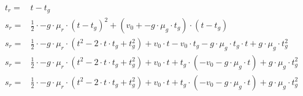\begin{equation}
\begin{aligned}
    t_r = & t - t_g\\
    s_r = & \frac{1}{2} \cdot -g \cdot \mu_r \cdot (t - t_g)^2 + (v_0 + -g \cdot \mu_g \cdot t_g) \cdot (t - t_g)\\
    s_r = & \frac{1}{2} \cdot -g \cdot \mu_r \cdot (t^2 - 2 \cdot t \cdot t_g + t_g^2) + v_0 \cdot t - v_0 \cdot t_g - g \cdot \mu_g \cdot t_g \cdot t + g \cdot \mu_g \cdot t_g^2\\
    s_r = & \frac{1}{2} \cdot -g \cdot \mu_r \cdot (t^2 - 2 \cdot t \cdot t_g + t_g^2) + v_0 \cdot t + t_g \cdot (-v_0 - g \cdot \mu_g \cdot t) + g \cdot \mu_g \cdot t_g^2\\
    s_r = & \frac{1}{2} \cdot -g \cdot \mu_r \cdot (t^2 - 2 \cdot t \cdot t_g + t_g^2) + v_0 \cdot t + t_g \cdot (-v_0 - g \cdot \mu_g \cdot t) + g \cdot \mu_g \cdot t_g^2\\
\end{aligned}
\end{equation}


